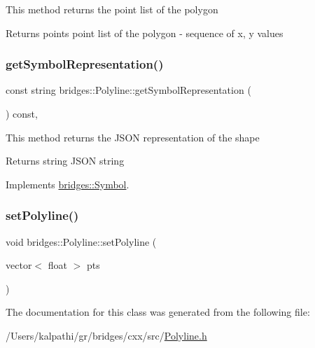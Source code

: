 This method returns the point list of the polygon

\begin{DoxyReturn}{Returns}
points point list of the polygon -\/ sequence of x, y values 
\end{DoxyReturn}
\mbox{\label{classbridges_1_1_polyline_a850d2f619466b159c7874317f9eaf0a3}} 
\subsubsection{\texorpdfstring{getSymbolRepresentation()}{getSymbolRepresentation()}}
{\footnotesize\ttfamily const string bridges\+::\+Polyline\+::get\+Symbol\+Representation (\begin{DoxyParamCaption}{ }\end{DoxyParamCaption}) const\hspace{0.3cm}{\ttfamily [inline]}, {\ttfamily [virtual]}}

This method returns the J\+S\+ON representation of the shape

\begin{DoxyReturn}{Returns}
string J\+S\+ON string 
\end{DoxyReturn}


Implements \mbox{\hyperlink{classbridges_1_1_symbol_ab4dd31fbc736b2e58e8b8bb8446eac73}{bridges\+::\+Symbol}}.

\mbox{\label{classbridges_1_1_polyline_adaae3e064c497291beb1ba3cacb4b9a0}} 
\subsubsection{\texorpdfstring{setPolyline()}{setPolyline()}}
{\footnotesize\ttfamily void bridges\+::\+Polyline\+::set\+Polyline (\begin{DoxyParamCaption}\item[{vector$<$ float $>$}]{pts }\end{DoxyParamCaption})\hspace{0.3cm}{\ttfamily [inline]}}



The documentation for this class was generated from the following file\+:\begin{DoxyCompactItemize}
\item 
/\+Users/kalpathi/gr/bridges/cxx/src/\mbox{\hyperlink{_polyline_8h}{Polyline.\+h}}\end{DoxyCompactItemize}
